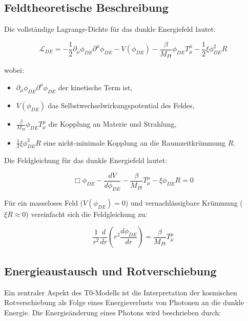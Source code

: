 \documentclass[a4paper,12pt]{article}
\theoremstyle{definition}
\theoremstyle{remark}
\begin{document}
	\subsection{Feldtheoretische Beschreibung}
	
	Die vollständige Lagrange-Dichte für das dunkle Energiefeld lautet:
	
	\begin{equation}
		\mathcal{L}_{DE} = -\frac{1}{2}\partial_\mu \phi_{DE} \partial^\mu \phi_{DE} - V(\phi_{DE}) - \frac{\beta}{M_{Pl}} \phi_{DE} T^{\mu}_{\mu} - \frac{1}{2}\xi \phi_{DE}^2 R
	\end{equation}
	
	wobei:
	\begin{itemize}
		\item $\partial_\mu \phi_{DE} \partial^\mu \phi_{DE}$ der kinetische Term ist,
		\item $V(\phi_{DE})$ das Selbstwechselwirkungspotential des Feldes,
		\item $\frac{\beta}{M_{Pl}} \phi_{DE} T^{\mu}_{\mu}$ die Kopplung an Materie und Strahlung,
		\item $\frac{1}{2}\xi \phi_{DE}^2 R$ eine nicht-minimale Kopplung an die Raumzeitkrümmung $R$.
	\end{itemize}
	
	Die Feldgleichung für das dunkle Energiefeld lautet:
	
	\begin{equation}
		\Box\phi_{DE} - \frac{dV}{d\phi_{DE}} - \frac{\beta}{M_{Pl}}T^{\mu}_{\mu} - \xi \phi_{DE} R = 0
	\end{equation}
	
	Für ein masseloses Feld ($V(\phi_{DE}) = 0$) und vernachlässigbare Krümmung ($\xi R \approx 0$) vereinfacht sich die Feldgleichung zu:
	
	\begin{equation}
		\frac{1}{r^2}\frac{d}{dr}\left(r^2\frac{d\phi_{DE}}{dr}\right) = \frac{\beta}{M_{Pl}}T^{\mu}_{\mu}
	\end{equation}
	
	\subsection{Energieaustausch und Rotverschiebung}
	
	Ein zentraler Aspekt des T0-Modells ist die Interpretation der kosmischen Rotverschiebung als Folge eines Energieverlusts von Photonen an die dunkle Energie. Die Energieänderung eines Photons wird beschrieben durch:
	
\end{document}
